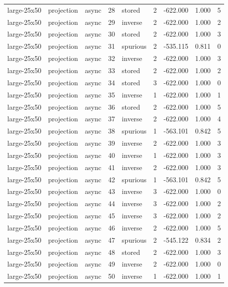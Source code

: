 \begin{tabular}{lllrlrrrr}
large-25x50 & projection & async & 28 & stored & 2 & -622.000 & 1.000 & 5 \\
large-25x50 & projection & async & 29 & inverse & 2 & -622.000 & 1.000 & 2 \\
large-25x50 & projection & async & 30 & stored & 2 & -622.000 & 1.000 & 3 \\
large-25x50 & projection & async & 31 & spurious & 2 & -535.115 & 0.811 & 0 \\
large-25x50 & projection & async & 32 & inverse & 2 & -622.000 & 1.000 & 3 \\
large-25x50 & projection & async & 33 & stored & 2 & -622.000 & 1.000 & 2 \\
large-25x50 & projection & async & 34 & stored & 3 & -622.000 & 1.000 & 0 \\
large-25x50 & projection & async & 35 & inverse & 1 & -622.000 & 1.000 & 1 \\
large-25x50 & projection & async & 36 & stored & 2 & -622.000 & 1.000 & 5 \\
large-25x50 & projection & async & 37 & inverse & 2 & -622.000 & 1.000 & 4 \\
large-25x50 & projection & async & 38 & spurious & 1 & -563.101 & 0.842 & 5 \\
large-25x50 & projection & async & 39 & inverse & 2 & -622.000 & 1.000 & 3 \\
large-25x50 & projection & async & 40 & inverse & 1 & -622.000 & 1.000 & 3 \\
large-25x50 & projection & async & 41 & inverse & 2 & -622.000 & 1.000 & 3 \\
large-25x50 & projection & async & 42 & spurious & 1 & -563.101 & 0.842 & 5 \\
large-25x50 & projection & async & 43 & inverse & 3 & -622.000 & 1.000 & 0 \\
large-25x50 & projection & async & 44 & inverse & 3 & -622.000 & 1.000 & 2 \\
large-25x50 & projection & async & 45 & inverse & 3 & -622.000 & 1.000 & 2 \\
large-25x50 & projection & async & 46 & inverse & 2 & -622.000 & 1.000 & 5 \\
large-25x50 & projection & async & 47 & spurious & 2 & -545.122 & 0.834 & 2 \\
large-25x50 & projection & async & 48 & stored & 2 & -622.000 & 1.000 & 3 \\
large-25x50 & projection & async & 49 & inverse & 2 & -622.000 & 1.000 & 0 \\
large-25x50 & projection & async & 50 & inverse & 1 & -622.000 & 1.000 & 1 \\

\end{tabular}
